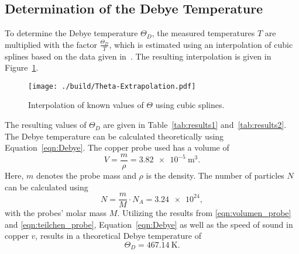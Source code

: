 \subsection{Determination of the Debye Temperature}
To determine the Debye temperature $\Theta_{D}$, the measured temperatures $T$ are multiplied with the factor $\frac{\Theta_{D}}{T}$, which is estimated
using an interpolation of cubic splines based on the data given in~\cite{V47}. The resulting interpolation is given in Figure~\ref{fig:interpol2}.
\begin{figure}[H]
	\centering
	\texttt{[image: ./build/Theta-Extrapolation.pdf]}
	\caption{Interpolation of known values of $\Theta$ using cubic splines.}
	\label{fig:interpol2}
\end{figure}
\noindent
The resulting values of $\Theta_{D}$ are given in Table~\ref{tab:results1} and~\ref{tab:results2}.
The Debye temperature can be calculated theoretically using Equation~\ref{eqn:Debye}. The copper probe used has a volume of
\begin{equation}
	V = \frac{m}{\rho} = \SI{3.82e-5}{\meter\cubed}.
	\label{eqn:volumen_probe}
\end{equation}
Here, $m$ denotes the probe mass and $\rho$ is the density.
The number of particles $N$ can be calculated using
\begin{equation}
	N = \frac{m}{M} \cdot N_{A} = \SI{3.24e24},
	\label{eqn:teilchen_probe}
\end{equation}
with the probes' molar mass $M$. Utilizing the results from \ref{eqn:volumen_probe} and \ref{eqn:teilchen_probe}, Equation~\ref{eqn:Debye} as well as
the speed of sound in copper $v$, results in a theoretical Debye temperature of
\begin{equation}
	\Theta_{D} = \SI{467.14}{\kelvin}.
	\label{eqn:Debye_Theorie}
\end{equation}
